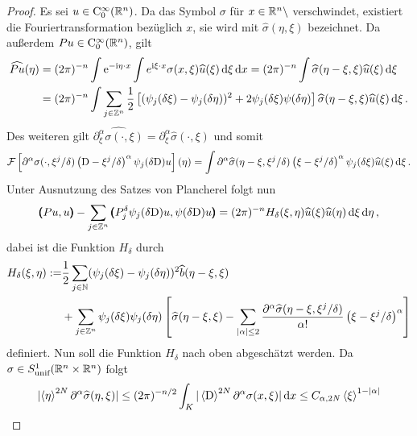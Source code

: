 \begin{proof}
Es sei $u\in\mathrm C^\infty_0(\mathbb R^n)$. Da das Symbol $\sigma$ für $x\in\mathbb R^n\setminus$ verschwindet, existiert die Fouriertransformation bezüglich $x$, sie wird mit $\widehat\sigma (\eta,\xi)$ bezeichnet. Da außerdem $ P u\in\mathrm C^\infty_0(\mathbb R^n)$, gilt
\begin{align}
\widehat{ P u}(\eta) &= (2\pi)^{-n}\int \mathrm e^{-\mathrm i\eta\cdot x} \int e^{\mathrm i\xi\cdot x}\sigma(x,\xi) \widehat u (\xi) \,\mathrm d\xi\,\mathrm d x = (2\pi)^{-n}\int \widehat\sigma(\eta - \xi,\xi)\widehat u(\xi)\,\mathrm d\xi \\
&= (2\pi)^ {-n}\int \sum_{j\in\mathbb Z^n} \frac 1 2\left[(\psi_j(\delta \xi) - \psi_j(\delta \eta))^2 + 2 \psi_j(\delta\xi)\psi(\delta \eta)\right] \widehat\sigma(\eta - \xi,\xi)\widehat u(\xi)\,\mathrm d\xi\,.
\end{align}
Des weiteren gilt $\widehat{\partial^\alpha_\xi\sigma(\cdot,\xi)} = \partial_\xi^\alpha\widehat \sigma(\cdot,\xi)$ und somit
\begin{align}
\mathcal{F}\left[\partial^\alpha\sigma(\cdot,\xi^j/\delta)\left( \mathrm D - \xi^j/\delta\right)^\alpha\psi_j(\delta\mathrm D)u\right](\eta) = \int \partial ^\alpha\widehat \sigma(\eta-\xi,\xi^j/\delta)\left( \xi - \xi^j/\delta\right)^\alpha\psi_j(\delta\xi)\widehat u(\xi)\,\mathrm d\xi\,.
\end{align}
Unter Ausnutzung des Satzes von Plancherel folgt nun
\begin{align}
\pmb(Pu,u\pmb)  - \sum_{j\in\mathbb Z^n}\pmb( P_j^\delta\psi_j(\delta\mathrm D )u, \psi(\delta\mathrm D )u \pmb) = (2\pi)^{-n} \relax H_\delta (\xi,\eta) \widehat u(\xi)\widehat u(\eta)\,\mathrm d\xi\,\mathrm d\eta\,,
\end{align}
dabei ist die Funktion $H_\delta$ durch
\begin{align}\label{eq:hdeltadef}
H_\delta(\xi,\eta) := &\frac 1 2 \sum_{j\in \mathbb N}(\psi_j(\delta \xi) - \psi_j(\delta \eta))^2\widehat b(\eta-\xi,\xi)\\
&+ \sum_{j\in\mathbb Z^n} \psi_j(\delta\xi)\psi_j(\delta \eta)\left[
\widehat \sigma(\eta-\xi,\xi) - \sum_{\lvert\alpha\rvert \le 2} \frac{\partial ^\alpha\widehat\sigma(\eta-\xi,\xi^j/\delta)}{\alpha!}\left( \xi - \xi^j/\delta\right)^\alpha
\right]
\end{align}
definiert. Nun soll die Funktion $H_\delta$ nach oben abgeschätzt werden. Da $\sigma\in S^1_{\text{unif}}(\mathbb R^n\times\mathbb R^n)$ folgt
\begin{align}
\abs{\braket{\eta}^{2N}\partial^\alpha\widehat\sigma(\eta,\xi)}\le (2\pi)^{-n/2}\int_K |\braket{\mathrm D}^{2N}\partial^\alpha\sigma(x,\xi)|\d x \le C_{\alpha,2N} \braket{\xi}^{1 - \abs \alpha}

\end{align}
\end{proof}
